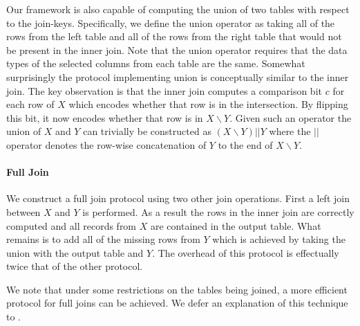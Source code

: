 Our framework is also capable of computing the union of two tables with respect to the join-keys. Specifically, we define the union operator as taking all of the rows from the left table and all of the rows from the right table that would not be present in the inner join. Note that the union operator requires that the data types of the selected columns from each table are the same. Somewhat surprisingly the protocol implementing union is conceptually similar to the inner join. The key observation is that the inner join computes a comparison bit $c$ for each row of $X$ which encodes whether that row is in the intersection. By flipping this bit, it now encodes whether that row is in $X\backslash Y$. Given such an operator the union of $X$ and $Y$ can trivially be constructed as $(X\backslash Y) || Y$ where the $||$ operator denotes the row-wise concatenation of $Y$ to the end of $X\backslash Y$.


\paragraph{Full Join}


We construct a full join protocol using two other join operations. First a left join between $X$ and $Y$ is performed. As a result the rows in the inner join are correctly computed and all records from $X$ are contained in the output table. What remains is to add all of the missing rows from $Y$ which is achieved by taking the union with the output table and $Y$. The overhead of this protocol is effectually twice that of the other protocol.

We note that under some restrictions on the tables being joined, a more efficient protocol for full joins can be achieved. We defer an explanation of this technique to .

